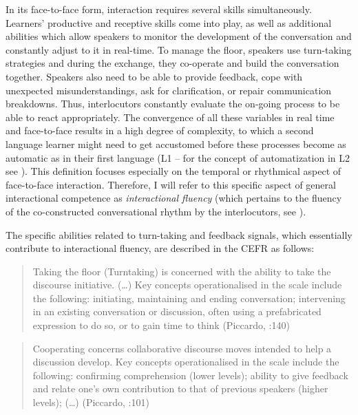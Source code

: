 In its face-to-face form, interaction requires several skills simultaneously. Learners’ productive and receptive skills come into play, as well as additional abilities which allow speakers to monitor the development of the conversation and constantly adjust to it in real-time. To manage the floor, speakers use turn-taking strategies and during the exchange, they co-operate and build the conversation together. Speakers also need to be able to provide feedback, cope with unexpected misunderstandings, ask for clarification, or repair communication breakdowns. Thus, interlocutors constantly evaluate the on-going process to be able to react appropriately. The convergence of all these variables in real time and face-to-face results in a high degree of complexity, to which a second language learner might need to get accustomed before these processes become as automatic as in their first language (L1 – for the concept of automatization in L2 see \citealt{Kormos2006}). This definition focuses especially on the temporal or rhythmical aspect of face-to-face interaction. Therefore, I will refer to this specific aspect of general interactional competence as \textit{interactional fluency} (which pertains to the fluency of the co-constructed conversational rhythm by the interlocutors, see \citealt{Peltonen2024,Peltonen2020}).

The specific abilities related to turn-taking and feedback signals, which essentially contribute to interactional fluency, are described in the CEFR as follows:

\begin{quote}
Taking the floor (Turntaking) is concerned with the ability to take the discourse initiative. (…) Key concepts operationalised in the scale include the following: initiating, maintaining and ending conversation; intervening in an existing conversation or discussion, often using a prefabricated expression to do so, or to gain time to think (Piccardo, \citealt{GoodierNorth2018}:140) 
\end{quote}

\begin{quote}
Cooperating concerns collaborative discourse moves intended to help a discussion develop. Key concepts operationalised in the scale include the following: confirming comprehension (lower levels); ability to give feedback and relate one’s own contribution to that of previous speakers (higher levels); (…) (Piccardo, \citealt{GoodierNorth2018}:101)
\end{quote}

